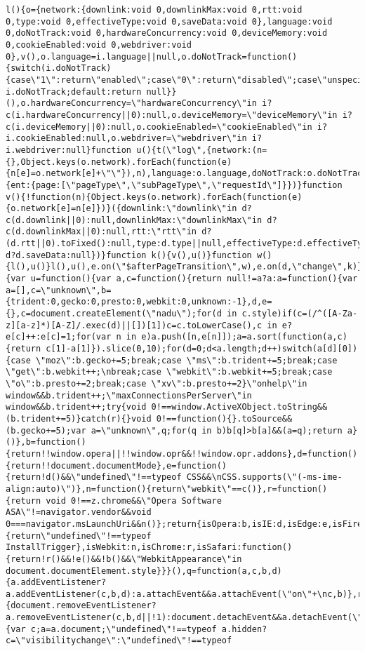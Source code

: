 \documentclass[
]{article}
\begin{document}
\begin{verbatim}
l(){o={network:{downlink:void 0,downlinkMax:void 0,rtt:void 0,type:void 0,effectiveType:void 0,saveData:void 0},language:void 0,doNotTrack:void 0,hardwareConcurrency:void 0,deviceMemory:void 0,cookieEnabled:void 0,webdriver:void 0},v(),o.language=i.language||null,o.doNotTrack=function(){switch(i.doNotTrack){case\"1\":return\"enabled\";case\"0\":return\"disabled\";case\"unspecified\":return i.doNotTrack;default:return null}}(),o.hardwareConcurrency=\"hardwareConcurrency\"in i?c(i.hardwareConcurrency||0):null,o.deviceMemory=\"deviceMemory\"in i?c(i.deviceMemory||0):null,o.cookieEnabled=\"cookieEnabled\"in i?i.cookieEnabled:null,o.webdriver=\"webdriver\"in i?i.webdriver:null}function u(){t(\"log\",{network:(n={},Object.keys(o.network).forEach(function(e){n[e]=o.network[e]+\"\"}),n),language:o.language,doNotTrack:o.doNotTrack,hardwareConcurrency:o.hardwareConcurrency,deviceMemory:o.deviceMemory,cookieEnabled:o.cookieEnabled,webdriver:o.webdriver,schemaId:r},{ent:{page:[\"pageType\",\"subPageType\",\"requestId\"]}})}function v(){!function(n){Object.keys(o.network).forEach(function(e){o.network[e]=n[e]})}({downlink:\"downlink\"in d?c(d.downlink||0):null,downlinkMax:\"downlinkMax\"in d?c(d.downlinkMax||0):null,rtt:\"rtt\"in d?(d.rtt||0).toFixed():null,type:d.type||null,effectiveType:d.effectiveType||null,saveData:\"saveData\"in d?d.saveData:null})}function k(){v(),u()}function w(){l(),u()}l(),u(),e.on(\"$afterPageTransition\",w),e.on(d,\"change\",k)});\n(function(t,z,C){var u=function(){var a,c=function(){return null!=a?a:a=function(){var a=[],c=\"unknown\",b={trident:0,gecko:0,presto:0,webkit:0,unknown:-1},d,e={},c=document.createElement(\"nadu\");for(d in c.style)if(c=(/^([A-Za-z][a-z]*)[A-Z]/.exec(d)||[])[1])c=c.toLowerCase(),c in e?e[c]++:e[c]=1;for(var n in e)a.push([n,e[n]]);a=a.sort(function(a,c){return c[1]-a[1]}).slice(0,10);for(d=0;d<a.length;d++)switch(a[d][0]){case \"moz\":b.gecko+=5;break;case \"ms\":b.trident+=5;break;case \"get\":b.webkit++;\nbreak;case \"webkit\":b.webkit+=5;break;case \"o\":b.presto+=2;break;case \"xv\":b.presto+=2}\"onhelp\"in window&&b.trident++;\"maxConnectionsPerServer\"in window&&b.trident++;try{void 0!==window.ActiveXObject.toString&&(b.trident+=5)}catch(r){}void 0!==function(){}.toSource&&(b.gecko+=5);var a=\"unknown\",q;for(q in b)b[q]>b[a]&&(a=q);return a}()},b=function(){return!!window.opera||!!window.opr&&!!window.opr.addons},d=function(){return!!document.documentMode},e=function(){return!d()&&\"undefined\"!==typeof CSS&&\nCSS.supports(\"(-ms-ime-align:auto)\")},n=function(){return\"webkit\"==c()},r=function(){return void 0!==z.chrome&&\"Opera Software ASA\"!=navigator.vendor&&void 0===navigator.msLaunchUri&&n()};return{isOpera:b,isIE:d,isEdge:e,isFirefox:function(){return\"undefined\"!==typeof InstallTrigger},isWebkit:n,isChrome:r,isSafari:function(){return!r()&&!e()&&!b()&&\"WebkitAppearance\"in document.documentElement.style}}}(),q=function(a,c,b,d){a.addEventListener?a.addEventListener(c,b,d):a.attachEvent&&a.attachEvent(\"on\"+\nc,b)},r=function(a,c,b,d){document.removeEventListener?a.removeEventListener(c,b,d||!1):document.detachEvent&&a.detachEvent(\"on\"+c,b)},H=function(a){var c;a=a.document;\"undefined\"!==typeof a.hidden?c=\"visibilitychange\":\"undefined\"!==typeof 
\end{verbatim}
\end{document}
